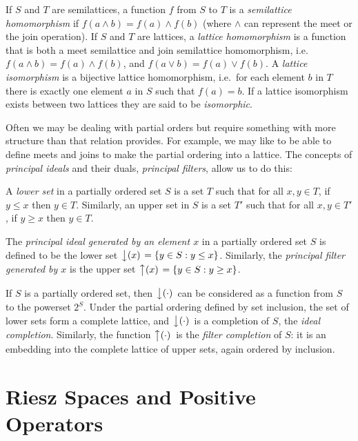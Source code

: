 \documentclass[12pt]{report}
\begin{document}
\begin{defn}
If $S$ and $T$ are semilattices, a function $f$ from $S$ to $T$ is a \emph{semilattice homomorphism} if $f(a \land b) = f(a) \land f(b)$ (where $\land$ can represent the meet or the join operation). If $S$ and $T$ are lattices, a \emph{lattice homomorphism} is a function that is both a meet semilattice and join semilattice homomorphism, i.e.~$f(a \land b) = f(a) \land f(b)$, and $f(a \lor b) = f(a) \lor f(b)$. A \emph{lattice isomorphism} is a bijective lattice homomorphism, i.e.~for each element $b$ in $T$ there is exactly one element $a$ in $S$ such that $f(a) = b$. If a lattice isomorphism exists between two lattices they are said to be \emph{isomorphic}.
\end{defn}

Often we may be dealing with partial orders but require something with more structure than that relation provides. For example, we may like to be able to define meets and joins to make the partial ordering into a lattice. The concepts of \emph{principal ideals} and their duals, \emph{principal filters}, allow us to do this:

\begin{defn}
A \emph{lower set} in a partially ordered set $S$ is a set $T$ such that for all $x,y \in T$, if $y \le x$ then $y \in T$. Similarly, an upper set in $S$ is a set $T'$ such that for all $x,y \in T'$, if $y \ge x$ then $y \in T$.

The \emph{principal ideal generated by an element $x$} in a partially ordered set $S$ is defined to be the lower set $\left\downarrow(x)\right. = \{y \in S : y \le x\}$. Similarly, the \emph{principal filter generated by $x$} is the upper set $\left\uparrow(x)\right. = \{y \in S : y \ge x\}$.
\end{defn}

\begin{prop}
If $S$ is a partially ordered set, then $\left\downarrow(\cdot)\right.$ can be considered as a function from $S$ to the powerset $2^S$. Under the partial ordering defined by set inclusion, the set of lower sets form a complete lattice, and $\left\downarrow(\cdot)\right.$ is a completion of $S$, the \emph{ideal completion}. Similarly, the function $\left\uparrow(\cdot)\right.$ is the \emph{filter completion} of $S$: it is an embedding into the complete lattice of upper sets, again ordered by inclusion.
\end{prop}


\section{Riesz Spaces and Positive Operators}
 \label{vector-lattices}
 
\end{document}
